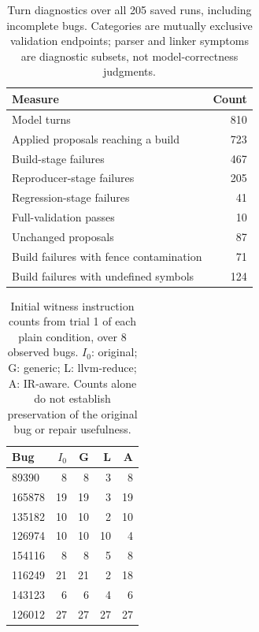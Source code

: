 \begin{table}[t]
\centering\scriptsize
\caption{Turn diagnostics over all 205 saved runs, including incomplete bugs. Categories are mutually exclusive validation endpoints; parser and linker symptoms are diagnostic subsets, not model-correctness judgments.}
\label{tab:v2-diagnostics}
\begin{tabular}{@{}lr@{}}\toprule
Measure & Count \\ \midrule
Model turns & 810 \\
Applied proposals reaching a build & 723 \\
Build-stage failures & 467 \\
Reproducer-stage failures & 205 \\
Regression-stage failures & 41 \\
Full-validation passes & 10 \\
Unchanged proposals & 87 \\
Build failures with fence contamination & 71 \\
Build failures with undefined symbols & 124 \\
\bottomrule\end{tabular}
\end{table}
\begin{table}[t]
\centering\scriptsize
\caption{Initial witness instruction counts from trial 1 of each plain condition, over 8 observed bugs. $I_0$: original; G: generic; L: llvm-reduce; A: IR-aware. Counts alone do not establish preservation of the original bug or repair usefulness.}
\label{tab:v2-reducers}
\begin{tabular}{@{}lrrrr@{}}\toprule
Bug & $I_0$ & G & L & A \\ \midrule
89390 & 8 & 8 & 3 & 8 \\
165878 & 19 & 19 & 3 & 19 \\
135182 & 10 & 10 & 2 & 10 \\
126974 & 10 & 10 & 10 & 4 \\
154116 & 8 & 8 & 5 & 8 \\
116249 & 21 & 21 & 2 & 18 \\
143123 & 6 & 6 & 4 & 6 \\
126012 & 27 & 27 & 27 & 27 \\
\bottomrule\end{tabular}
\end{table}
